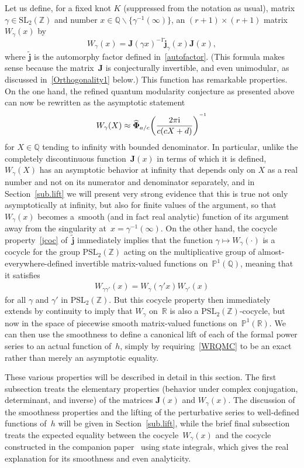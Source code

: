 \documentclass[pdftex]{sigma}
\numberwithin{equation}{section}
\def\BZ{\mathbb Z}
\def\BP{\mathbb P}
\def\l{\lambda}
\def\wt{\widetilde}
\def\SL{\mathrm{SL}}
\def\PSL{\mathrm{PSL}}
\def\Phih{\widehat\Phi}
\def\a{\alpha}
\def\l{\lambda}
\def\R{\mathbb R}
\def\Z{\mathbb Z}
\def\Q{\mathbb Q}
\def\i{^{-1}}
\def\a{\alpha}
\def\l{\lambda}
\def\s{\sigma}
\def\be{\begin{equation}}
\def\ee{\end{equation}}
\def\ssm{\smallsetminus}
\def\g{\gamma}
\def\bJ{J} \def\bJ{\mathbf{J}}
\def\bPhih{\mathbf{\Phih}}
\def\jp{\mathbf{j}}
\def\jt{\jp_\l} %
\def\jt{\jp_{\text{tw}}} %
\def\jt{\jp_{\textsf T}} %
\def\jt{\jp^{(\l)}}
\def\jt{\jp^{(\l)}}
\def\jt{\wt{\jp}}
\begin{document}
Let us define, for a fixed knot $K$ (suppressed from the notation as usual),
matrix~$\g\in\SL_2(\Z)$ and number $x\in\Q\ssm\big\{\g^{-1}(\infty)\big\}$,
an $(r+1)\times (r+1)$ matrix~$W_\g(x)$ by
\be
\label{Wdef}
W_\g(x) = \bJ(\g x)^{-1} \jt_\g(x)  \bJ(x)  ,
\ee
where $\jt$ is the automorphy factor defined in~\eqref{autofactor}.
(This formula makes sense because the matrix~$\bJ$ is conjecturally invertible, and
even unimodular, as discussed in~\eqref{Orthogonality1} below.) This
function has remarkable properties. On the one hand, the refined quantum modularity
conjecture as presented above can now be rewritten as the asymptotic statement
\be
\label{WRQMC}
W_\g(X) \approx \bPhih_{a/c}{\left(\frac{2\pi {\rm i}}{c(cX+d)}\right)}^{\i}
\ee
for $X\in\Q$ tending to infinity with bounded denominator. In particular, unlike the
completely discontinuous function~$\bJ(x)$ in terms of which it is defined, $W_\g(X)$
has an asymptotic behavior at infinity that depends only on $X$ as a real number and
not on its numerator and denominator separately, and in Section~\ref{sub.lift}
we will present very strong evidence that this is true not only asymptotically at
infinity, but also for finite values of the argument, so that $W_\g(x)$ becomes a~smooth (and in fact real analytic) function of its argument away from the singularity
at~${x=\g\i(\infty)}$. On the other hand, the cocycle property~\eqref{jcoc} of~$\jt$
immediately implies that the function $\g\mapsto W_\g(\cdot)$ is a cocycle
for the group $\PSL_2(\Z)$ acting on the multiplicative group of
almost-everywhere-defined invertible matrix-valued functions on~$\BP^1(\Q)$, meaning
that it satisfies
\begin{gather}
\label{cocycle}
W_{\g\g'}(x) = W_\g(\g' x)  W_{\g'}(x)
\end{gather}
for all $\g$ and $\g'$ in $\PSL_2(\BZ)$. But this cocycle property then immediately
extends by continuity to imply that $W_\g$ on~$\R$ is also a $\PSL_2(\Z)$-cocycle,
but now in the space of piecewise smooth matrix-valued
functions on~$\BP^1(\R)$. We can then use the smoothness to define a canonical lift
of each of the formal power series \smash{$\Phi_\a^{(\s,\s')}(h)$} to an actual function of~$h$,
simply by requiring~\eqref{WRQMC} to be an exact rather than merely an asymptotic
equality.

These various properties will be described in detail in this section. The first
subsection treats the elementary properties (behavior under complex conjugation,
determinant, and inverse) of the matrices $\bJ(x)$ and $W_\g(x)$. The discussion of
the smoothness properties and the lifting of the perturbative series
\smash{$\Phi_\a^{(\s,\s')}(h)$} to well-defined functions of~$h$ will be given in
Section~\ref{sub.lift}, while the brief final subsection treats the expected equality
between the cocycle~$W_\g(x)$ and the cocycle constructed in the companion
paper~\cite{GZ:qseries} using state integrals, which gives the real explanation for
its smoothness and even analyticity.
\end{document}
